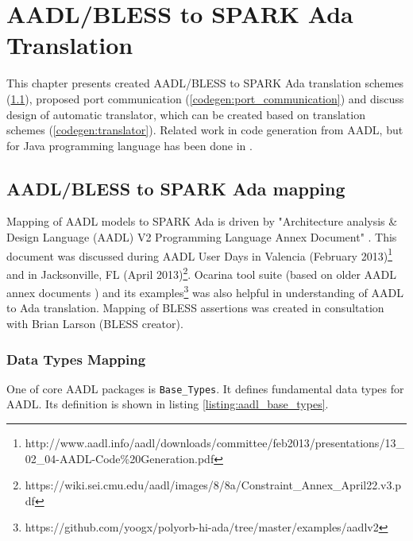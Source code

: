 
\cleardoublepage


\chapter{AADL/BLESS to SPARK Ada Translation}
\label{codegen}

This chapter presents created AADL/BLESS to SPARK Ada translation schemes (\ref{codegen:mapping}), proposed port communication (\ref{codegen:port_communication}) and discuss design of automatic translator, which can be created based on translation schemes (\ref{codegen:translator}). Related work in code generation from AADL, but for Java programming language has been done in \cite{MAP:Paper}. 



\section{AADL/BLESS to SPARK Ada mapping}
\label{codegen:mapping}


Mapping of AADL models to SPARK Ada is driven by "Architecture analysis \& Design Language (AADL) V2 Programming Language Annex Document" \cite{AnnexDoc}. This document was discussed during AADL User Days in Valencia (February 2013)\footnote{http://www.aadl.info/aadl/downloads/committee/feb2013/presentations/13\_02\_04-AADL-Code\%20Generation.pdf} and in Jacksonville, FL (April 2013)\footnote{https://wiki.sei.cmu.edu/aadl/images/8/8a/Constraint\_Annex\_April22.v3.pdf}. Ocarina tool suite (based on older AADL annex documents \cite{Ocarina:Article}) and its examples\footnote{https://github.com/yoogx/polyorb-hi-ada/tree/master/examples/aadlv2} was also helpful in understanding of AADL to Ada translation. Mapping of BLESS assertions was created in consultation with Brian Larson (BLESS creator).
 


\subsection{Data Types Mapping}
\label{codegen:mapping:data}

One of core AADL packages is \lstinline{Base_Types}. It defines fundamental data types for AADL. Its definition is shown in listing \ref{listing:aadl_base_types}.

